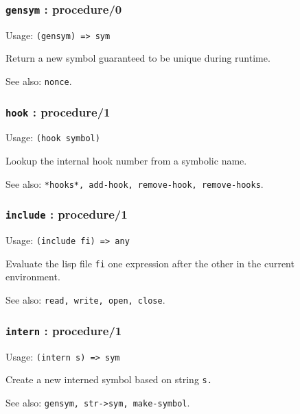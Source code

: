 \documentclass[
]{article}
\newcommand{\passthrough}[1]{#1}
\begin{document}
\hypertarget{gensym-procedure0}{%
\subsubsection{\texorpdfstring{\texttt{gensym} :
procedure/0}{gensym : procedure/0}}\label{gensym-procedure0}}

Usage: \passthrough{\lstinline!(gensym) => sym!}

Return a new symbol guaranteed to be unique during runtime.

See also: \passthrough{\lstinline!nonce!}.

\hypertarget{hook-procedure1}{%
\subsubsection{\texorpdfstring{\texttt{hook} :
procedure/1}{hook : procedure/1}}\label{hook-procedure1}}

Usage: \passthrough{\lstinline!(hook symbol)!}

Lookup the internal hook number from a symbolic name.

See also:
\passthrough{\lstinline!*hooks*, add-hook, remove-hook, remove-hooks!}.

\hypertarget{include-procedure1}{%
\subsubsection{\texorpdfstring{\texttt{include} :
procedure/1}{include : procedure/1}}\label{include-procedure1}}

Usage: \passthrough{\lstinline!(include fi) => any!}

Evaluate the lisp file \passthrough{\lstinline!fi!} one expression after
the other in the current environment.

See also: \passthrough{\lstinline!read, write, open, close!}.

\hypertarget{intern-procedure1}{%
\subsubsection{\texorpdfstring{\texttt{intern} :
procedure/1}{intern : procedure/1}}\label{intern-procedure1}}

Usage: \passthrough{\lstinline!(intern s) => sym!}

Create a new interned symbol based on string
\passthrough{\lstinline!s.!}

See also: \passthrough{\lstinline!gensym, str->sym, make-symbol!}.
\end{document}
